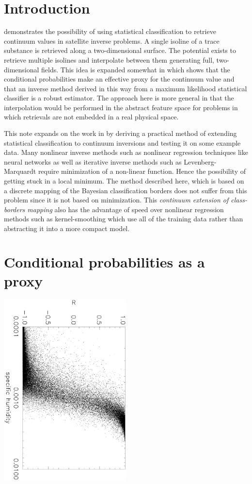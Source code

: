 \documentclass{article}
\newcommand{\italics}[1]{{\it #1}}
\begin{document}
\section{Introduction}

\citet{Mills2009} demonstrates the possibility of using statistical classification 
to retrieve continuum values in satellite inverse problems.
A single isoline of a trace substance is retrieved along a
two-dimensional surface.
The potential exists to retrieve multiple isolines and interpolate between
them generating full, two-dimensional fields.
This idea is expanded somewhat in \citet{Mills2011}
which shows that the conditional probabilities make an effective proxy
for the continuum value and that an inverse method derived in this way 
from a maximum likelihood statistical classifier is a robust estimator.
The approach here is more general in that the interpolation
would be performed in the abstract feature space for problems in
which retrievals are not embedded in a real physical space.

This note expands on the work in \citet{Mills2011} by deriving a practical method
of extending statistical classification to continuum inversions and testing it on some example data.
Many nonlinear inverse methods such as nonlinear regression techniques like neural
networks as well as iterative inverse methods such as Levenberg-Marquardt
require minimization of a non-linear function.
Hence the possibility of getting stuck in a local minimum.
The method described here, which is based on a discrete mapping of the Bayesian
classification borders 
does not suffer from this problem since it is not based on minimization.
This \italics{continuum extension of class-borders mapping} also has the advantage
of speed over nonlinear regression methods such as kernel-smoothing which
use all of the training data rather than abstracting it into a more compact model.

\section{Conditional probabilities as a proxy}

\includegraphics[angle=90,width=0.5\textwidth]{qvsr}
\end{document}
